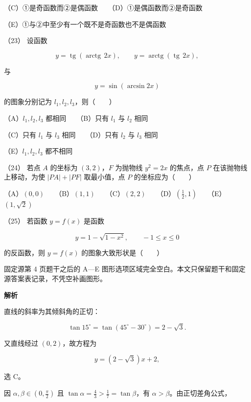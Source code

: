 \begin{answer}
（C）①是奇函数而②是偶函数　　（D）①是偶函数而②是奇函数

（E）①与②中至少有一个既不是奇函数也不是偶函数

（23） 设函数

\nopagebreak[4]
\[
y=\operatorname{tg}(\operatorname{arctg}\,2x),\qquad
y=\operatorname{arctg}(\operatorname{tg}\,2x),
\]

与

\nopagebreak[4]
\[
y=\sin(\arcsin 2x)
\]

的图象分别记为 $l_1,l_2,l_3$，则\mbox{（　　）}

（A）$l_1,l_2,l_3$ 都相同　　（B）只有 $l_1$ 与 $l_2$ 相同

（C）只有 $l_1$ 与 $l_3$ 相同　　（D）只有 $l_2$ 与 $l_3$ 相同

（E）$l_1,l_2,l_3$ 都不相同

（24） 若点 $A$ 的坐标为 $(3,2)$，$F$ 为抛物线 $y^2=2x$ 的焦点，点 $P$ 在该抛物线上移动，为使 $|PA|+|PF|$ 取最小值，点 $P$ 的坐标应为\mbox{（　　）}

（A）$(0,0)$　　（B）$(1,1)$　　（C）$(2,2)$　　（D）$(\frac12,1)$　　（E）$(1,\sqrt2)$

（25） 若函数 $y=f(x)$ 是函数

\nopagebreak[4]
\[
y=1-\sqrt{1-x^2},\qquad -1\le x\le0
\]

的反函数，则 $y=f(x)$ 的图象大致形状是\mbox{（　　）}

\begin{gktip}
固定源第 4 页题干之后的 A—E 图形选项区域完全空白。本文只保留题干和固定源答案表记录，不凭空补画图形。
\end{gktip}

\textbf{解析}


直线的斜率为其倾斜角的正切：

\nopagebreak[4]
\[
\tan15^\circ=\tan(45^\circ-30^\circ)=2-\sqrt3.
\]

又直线经过 $(0,2)$，故方程为

\nopagebreak[4]
\[
y=(2-\sqrt3)x+2,
\]

选 C。


因 $\alpha,\beta\in(0,\frac\pi2)$ 且 $\tan\alpha=\frac43>\frac17=\tan\beta$，有 $\alpha>\beta$。由正切差角公式，


\end{answer}

